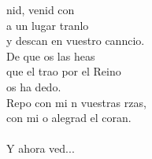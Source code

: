 \begin{cancion}%
	nid, venid con \\
	a un lugar tranlo\\
	y descan en  vuestro canncio. \\
	De que os  las heas\\
	que el trao por el Reino \\
	os ha dedo.\\
	Repo con mi n vuestras rzas,\\
	con mi o alegrad el coran. \\
	\jump\\
	Y ahora ved...\\
\end{cancion}%
